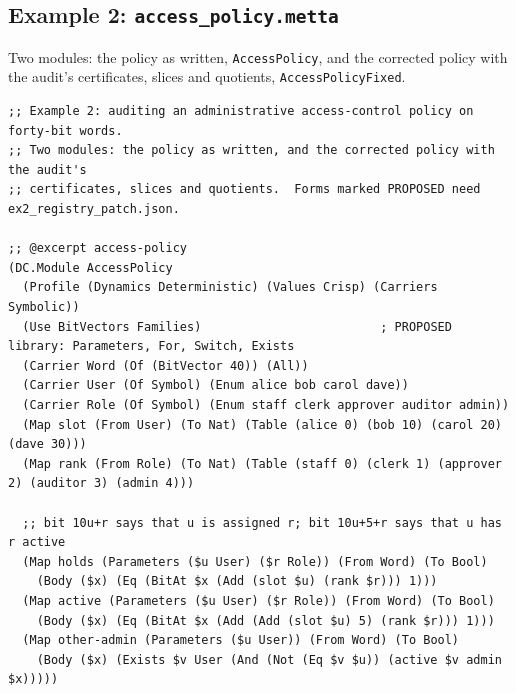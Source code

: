 \documentclass[11pt]{article}
\newcommand{\fpath}[1]{\nolinkurl{#1}}
\newcommand{\code}[1]{\texttt{#1}}
\theoremstyle{definition}
\theoremstyle{plain}
\begin{document}
\subsection{Example 2: \texorpdfstring{\fpath{access_policy.metta}}{access\_policy.metta}}
Two modules: the policy as written, \code{AccessPolicy}, and the corrected policy with the audit's certificates, slices and quotients, \code{AccessPolicyFixed}.
\begin{lstlisting}[style=mettafull]
;; Example 2: auditing an administrative access-control policy on forty-bit words.
;; Two modules: the policy as written, and the corrected policy with the audit's
;; certificates, slices and quotients.  Forms marked PROPOSED need ex2_registry_patch.json.

;; @excerpt access-policy
(DC.Module AccessPolicy
  (Profile (Dynamics Deterministic) (Values Crisp) (Carriers Symbolic))
  (Use BitVectors Families)                         ; PROPOSED library: Parameters, For, Switch, Exists
  (Carrier Word (Of (BitVector 40)) (All))
  (Carrier User (Of Symbol) (Enum alice bob carol dave))
  (Carrier Role (Of Symbol) (Enum staff clerk approver auditor admin))
  (Map slot (From User) (To Nat) (Table (alice 0) (bob 10) (carol 20) (dave 30)))
  (Map rank (From Role) (To Nat) (Table (staff 0) (clerk 1) (approver 2) (auditor 3) (admin 4)))

  ;; bit 10u+r says that u is assigned r; bit 10u+5+r says that u has r active
  (Map holds (Parameters ($u User) ($r Role)) (From Word) (To Bool)
    (Body ($x) (Eq (BitAt $x (Add (slot $u) (rank $r))) 1)))
  (Map active (Parameters ($u User) ($r Role)) (From Word) (To Bool)
    (Body ($x) (Eq (BitAt $x (Add (Add (slot $u) 5) (rank $r))) 1)))
  (Map other-admin (Parameters ($u User)) (From Word) (To Bool)
    (Body ($x) (Exists $v User (And (Not (Eq $v $u)) (active $v admin $x)))))


\end{lstlisting}
\end{document}
